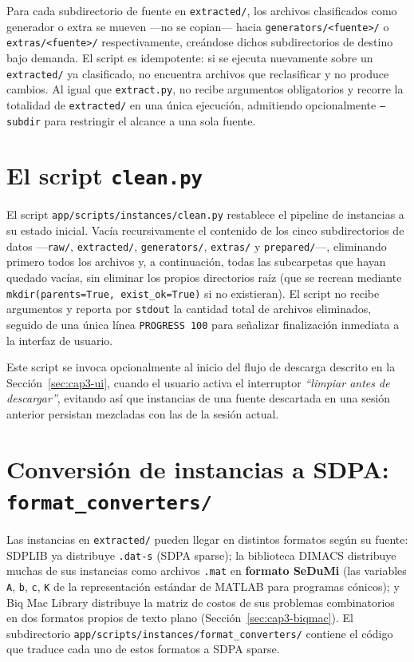 Para cada subdirectorio de fuente en \texttt{extracted/}, los archivos
clasificados como generador o extra se mueven —no se copian— hacia
\texttt{generators/<fuente>/} o \texttt{extras/<fuente>/} respectivamente,
cre\'andose dichos subdirectorios de destino bajo demanda. El script es
idempotente: si se ejecuta nuevamente sobre un \texttt{extracted/} ya
clasificado, no encuentra archivos que reclasificar y no produce cambios.
Al igual que \texttt{extract.py}, no recibe argumentos obligatorios y
recorre la totalidad de \texttt{extracted/} en una \'unica ejecuci\'on,
admitiendo opcionalmente \texttt{--subdir} para restringir el alcance a una
sola fuente.

\section{El script \texttt{clean.py}}
\label{sec:cap3-clean}

El script \texttt{app/scripts/instances/clean.py} restablece el pipeline de
instancias a su estado inicial. Vac\'ia recursivamente el contenido de los
cinco subdirectorios de datos —\texttt{raw/}, \texttt{extracted/},
\texttt{generators/}, \texttt{extras/} y \texttt{prepared/}—, eliminando
primero todos los archivos y, a
continuaci\'on, todas las subcarpetas que hayan quedado vac\'ias, sin
eliminar los propios directorios ra\'iz (que se recrean mediante
\texttt{mkdir(parents=True, exist\_ok=True)} si no existieran). El script
no recibe argumentos y reporta por \texttt{stdout} la cantidad total de
archivos eliminados, seguido de una \'unica l\'inea \texttt{PROGRESS 100}
para se\~nalizar finalizaci\'on inmediata a la interfaz de usuario.

Este script se invoca opcionalmente al inicio del flujo de descarga
descrito en la Secci\'on~\ref{sec:cap3-ui}, cuando el usuario activa el
interruptor \emph{``limpiar antes de descargar''}, evitando as\'i que
instancias de una fuente descartada en una sesi\'on anterior persistan
mezcladas con las de la sesi\'on actual.

\section{Conversi\'on de instancias a SDPA: \texttt{format\_converters/}}
\label{sec:cap3-converters}

Las instancias en \texttt{extracted/} pueden llegar en distintos formatos
seg\'un su fuente: SDPLIB ya distribuye \texttt{.dat-s} (SDPA sparse); la
biblioteca DIMACS distribuye muchas de sus instancias como archivos
\texttt{.mat} en \textbf{formato SeDuMi} (las variables \texttt{A}, \texttt{b},
\texttt{c}, \texttt{K} de la representaci\'on est\'andar de MATLAB para
programas c\'onicos); y Biq Mac Library distribuye la matriz de costos de
sus problemas combinatorios en dos formatos propios de texto plano
(Secci\'on~\ref{sec:cap3-biqmac}). El subdirectorio
\texttt{app/scripts/instances/format\_converters/} contiene el c\'odigo que
traduce cada uno de estos formatos a SDPA sparse.

